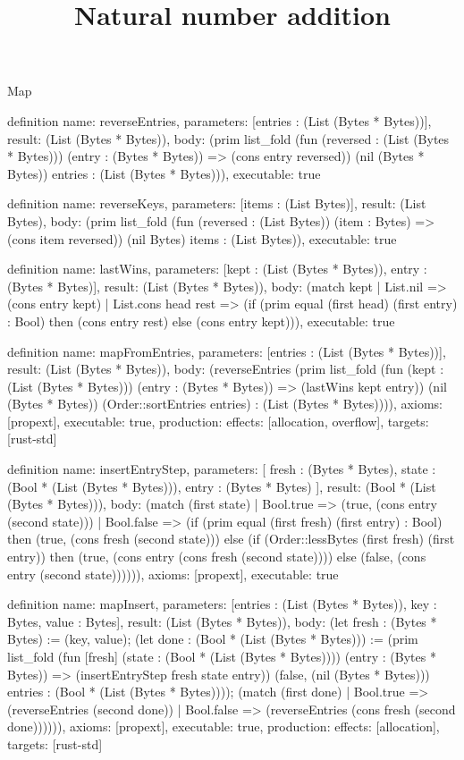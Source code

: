 \begin{lexlean}{Map}
\title{Natural number addition}
\begin{semanticmodule}
definition{
  name: reverseEntries,
  parameters: [entries : (List (Bytes * Bytes))],
  result: (List (Bytes * Bytes)),
  body: (prim list_fold (fun (reversed : (List (Bytes * Bytes))) (entry : (Bytes * Bytes)) => (cons entry reversed)) (nil (Bytes * Bytes)) entries : (List (Bytes * Bytes))),
  executable: true
}

definition{
  name: reverseKeys,
  parameters: [items : (List Bytes)],
  result: (List Bytes),
  body: (prim list_fold (fun (reversed : (List Bytes)) (item : Bytes) => (cons item reversed)) (nil Bytes) items : (List Bytes)),
  executable: true
}

definition{
  name: lastWins,
  parameters: [kept : (List (Bytes * Bytes)), entry : (Bytes * Bytes)],
  result: (List (Bytes * Bytes)),
  body: (match kept
    | List.nil => (cons entry kept)
    | List.cons head rest => (if (prim equal (first head) (first entry) : Bool) then (cons entry rest) else (cons entry kept))),
  executable: true
}

definition{
  name: mapFromEntries,
  parameters: [entries : (List (Bytes * Bytes))],
  result: (List (Bytes * Bytes)),
  body: (reverseEntries (prim list_fold (fun (kept : (List (Bytes * Bytes))) (entry : (Bytes * Bytes)) => (lastWins kept entry)) (nil (Bytes * Bytes)) (Order::sortEntries entries) : (List (Bytes * Bytes)))),
  axioms: [propext],
  executable: true,
  production: {effects: [allocation, overflow], targets: [rust-std]}
}

definition{
  name: insertEntryStep,
  parameters: [
    fresh : (Bytes * Bytes),
    state : (Bool * (List (Bytes * Bytes))),
    entry : (Bytes * Bytes)
  ],
  result: (Bool * (List (Bytes * Bytes))),
  body: (match (first state)
    | Bool.true => (true, (cons entry (second state)))
    | Bool.false => (if (prim equal (first fresh) (first entry) : Bool) then (true, (cons fresh (second state))) else (if (Order::lessBytes (first fresh) (first entry)) then (true, (cons entry (cons fresh (second state)))) else (false, (cons entry (second state)))))),
  axioms: [propext],
  executable: true
}

definition{
  name: mapInsert,
  parameters: [entries : (List (Bytes * Bytes)), key : Bytes, value : Bytes],
  result: (List (Bytes * Bytes)),
  body: (let fresh : (Bytes * Bytes) := (key, value); (let done : (Bool * (List (Bytes * Bytes))) := (prim list_fold (fun [fresh] (state : (Bool * (List (Bytes * Bytes)))) (entry : (Bytes * Bytes)) => (insertEntryStep fresh state entry)) (false, (nil (Bytes * Bytes))) entries : (Bool * (List (Bytes * Bytes)))); (match (first done)
    | Bool.true => (reverseEntries (second done))
    | Bool.false => (reverseEntries (cons fresh (second done)))))),
  axioms: [propext],
  executable: true,
  production: {effects: [allocation], targets: [rust-std]}
}


\end{semanticmodule}
\end{lexlean}
